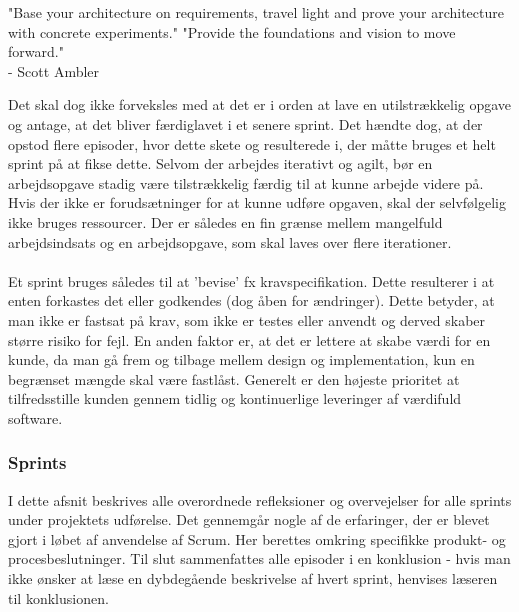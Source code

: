 \documentclass[a4paper,12pt,fleqn,oneside]{article}
\begin{document}
\begin{displayquote}
"Base your architecture on requirements, travel light and prove your architecture with concrete experiments."
"Provide the foundations and vision to move forward." \\
- Scott Ambler 
\end{displayquote}
Det skal dog ikke forveksles med at det er i orden at lave en utilstrækkelig opgave og antage, at det bliver færdiglavet i et senere sprint. Det hændte dog, at der opstod flere episoder, hvor dette skete og resulterede i, der måtte bruges et helt sprint på at fikse dette. Selvom der arbejdes iterativt og agilt, bør en arbejdsopgave stadig være tilstrækkelig færdig til at kunne arbejde videre på. Hvis der ikke er forudsætninger for at kunne udføre opgaven, skal der selvfølgelig ikke bruges ressourcer. Der er således en fin grænse mellem mangelfuld arbejdsindsats og en arbejdsopgave, som skal laves over flere iterationer.\\\\
Et sprint bruges således til at 'bevise' fx kravspecifikation. Dette resulterer i at enten forkastes det eller godkendes (dog åben for ændringer). Dette betyder, at man ikke er fastsat på krav, som ikke er testes eller anvendt og derved skaber større risiko for fejl. En anden faktor er, at det er lettere at skabe værdi for en kunde, da man gå frem og tilbage mellem design og implementation, kun en begrænset mængde skal være fastlåst. Generelt er den højeste prioritet at tilfredsstille kunden gennem tidlig og kontinuerlige leveringer af værdifuld software.

\subsubsection{Sprints}
I dette afsnit beskrives alle overordnede refleksioner og overvejelser for alle sprints under projektets udførelse. Det gennemgår nogle af de erfaringer, der er blevet gjort i løbet af anvendelse af Scrum. Her berettes omkring specifikke produkt- og procesbeslutninger. Til slut sammenfattes alle episoder i en konklusion - hvis man ikke ønsker at læse en dybdegående beskrivelse af hvert sprint, henvises læseren til konklusionen. 
\end{document}
